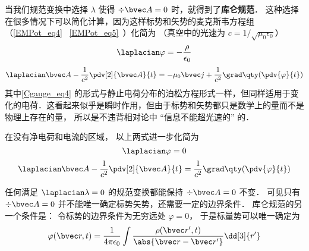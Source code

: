 
\begin{issues}
\issueDraft
\end{issues}


当我们规范变换中选择 $\lambda$ 使得 $\div \bvec A = 0$ 时，就得到了\textbf{库仑规范}． 这种选择在很多情况下可以简化计算，因为这样标势和矢势的麦克斯韦方程组（\autoref{EMPot_eq4}~ \autoref{EMPot_eq5}~）化简为 （真空中的光速为 $c = 1/\sqrt{\mu_0\epsilon_0}$）%
\begin{equation}\label{Cgauge_eq4}
\laplacian \varphi = -\frac{\rho}{\epsilon_0}
\end{equation}
\begin{equation}
\laplacian \bvec A - \frac{1}{c^2} \pdv[2]{\bvec A}{t} = -\mu_0\bvec j + \frac{1}{c^2} \grad\qty(\pdv{\varphi}{t})
\end{equation}
其中\autoref{Cgauge_eq4} 的形式与静止电荷分布的泊松方程形式一样，但同样适用于变化的电荷．这看起来似乎是瞬时作用，但由于标势和矢势都只是数学上的量而不是物理上存在的量， 所以是不违背相对论中 “信息不能超光速的” 的．

在没有净电荷和电流的区域， 以上两式进一步化简为
\begin{equation}
\laplacian \varphi = 0
\end{equation}
\begin{equation}
\laplacian \bvec A - \frac{1}{c^2}\pdv[2]{\bvec A}{t} = \frac{1}{c^2} \grad\qty(\pdv{\varphi}{t})
\end{equation}

任何满足 $\laplacian \lambda = 0$ 的规范变换都能保持 $\div \bvec A = 0$ 不变． 可见只有 $\div \bvec A = 0$ 并不能唯一确定标势矢势，还需要一定的边界条件． 库仑规范的另一个条件是： 令标势的边界条件为无穷远处 $\varphi = 0$， 于是标量势可以唯一确定为
\begin{equation}\label{Cgauge_eq1}
\varphi(\bvec r, t) = \frac{1}{4\pi\epsilon_0} \int \frac{\rho(\bvec r', t)}{\abs{\bvec r - \bvec r'}} \dd[3]{r'}
\end{equation}

